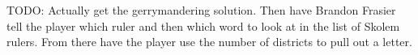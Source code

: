TODO: Actually get the gerrymandering solution. Then have Brandon Frasier tell the player which ruler and then which word to look at in the list of Skolem rulers. From there have the player use the number of districts to pull out a letter.
